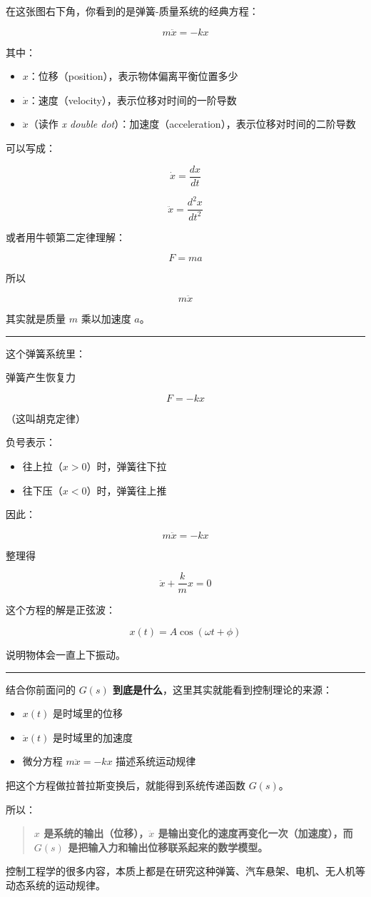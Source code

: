 \documentclass[UTF8,a4paper,11pt]{ctexart}
\begin{document}
在这张图右下角，你看到的是弹簧-质量系统的经典方程：

\[
m\ddot{x} = -kx
\]

其中：

\begin{itemize}
  \item $x$：位移（position），表示物体偏离平衡位置多少
  \item $\dot{x}$：速度（velocity），表示位移对时间的一阶导数
  \item $\ddot{x}$（读作 \emph{x double dot}）：加速度（acceleration），表示位移对时间的二阶导数
\end{itemize}

可以写成：

\[
\dot{x}=\frac{dx}{dt}
\]

\[
\ddot{x}=\frac{d^2x}{dt^2}
\]

或者用牛顿第二定律理解：

\[
F=ma
\]

所以

\[
m\ddot{x}
\]

其实就是质量 $m$ 乘以加速度 $a$。

\bigskip\noindent\rule{\linewidth}{0.4pt}\bigskip

这个弹簧系统里：

弹簧产生恢复力

\[
F=-kx
\]

（这叫胡克定律）

负号表示：

\begin{itemize}
  \item 往上拉（$x>0$）时，弹簧往下拉
  \item 往下压（$x<0$）时，弹簧往上推
\end{itemize}

因此：

\[
m\ddot{x}=-kx
\]

整理得

\[
\ddot{x}+\frac{k}{m}x=0
\]

这个方程的解是正弦波：

\[
x(t)=A\cos(\omega t+\phi)
\]

说明物体会一直上下振动。

\bigskip\noindent\rule{\linewidth}{0.4pt}\bigskip

结合你前面问的 \textbf{$G(s)$ 到底是什么}，这里其实就能看到控制理论的来源：

\begin{itemize}
  \item $x(t)$ 是时域里的位移
  \item $\ddot{x}(t)$ 是时域里的加速度
  \item 微分方程 $m\ddot{x}=-kx$ 描述系统运动规律
\end{itemize}

把这个方程做拉普拉斯变换后，就能得到系统传递函数 $G(s)$。

所以：

\begin{quote}
\textbf{$x$ 是系统的输出（位移），$\ddot{x}$ 是输出变化的速度再变化一次（加速度），而 $G(s)$ 是把输入力和输出位移联系起来的数学模型。}
\end{quote}

控制工程学的很多内容，本质上都是在研究这种弹簧、汽车悬架、电机、无人机等动态系统的运动规律。
\end{document}
